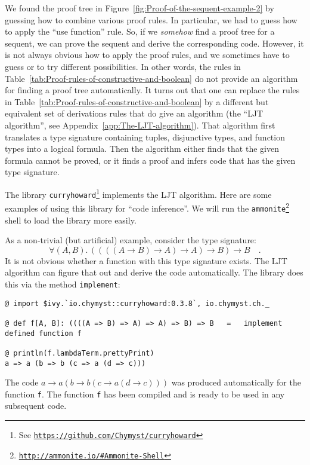 We found the proof tree in Figure~\ref{fig:Proof-of-the-sequent-example-2}
by guessing how to combine various proof rules. In particular, we
had to guess how to apply the \textsf{``}use function\textsf{''} rule. So, if we \emph{somehow}
find a proof tree for a sequent, we can prove the sequent and derive
the corresponding code. However, it is not always obvious how to apply
the proof rules, and we sometimes have to guess or to try different
possibilities. In other words, the rules in Table~\ref{tab:Proof-rules-of-constructive-and-boolean}
do not provide an algorithm for finding a proof tree automatically.
It turns out that one can replace the rules in Table~\ref{tab:Proof-rules-of-constructive-and-boolean}
by a different but equivalent set of derivations rules that do give
an algorithm (the \textsf{``}LJT algorithm\textsf{''}, see Appendix~\ref{app:The-LJT-algorithm}).
That algorithm first translates a type signature containing tuples,
disjunctive types, and function types into a logical formula. Then
the algorithm either finds that the given formula cannot be proved,
or it finds a proof and infers code that has the given type signature.

The library \lstinline!curryhoward!\texttt{}\footnote{See \texttt{\href{https://github.com/Chymyst/curryhoward}{https://github.com/Chymyst/curryhoward}}}
implements the LJT algorithm. Here are some examples of using this
library for \textsf{``}code inference\textsf{''}. We will run
the \lstinline!ammonite!\texttt{}\footnote{\texttt{\href{http://ammonite.io/\#Ammonite-Shell}{http://ammonite.io/\#Ammonite-Shell}}}
shell to load the library more easily.

As a non-trivial (but artificial) example, consider the type signature:
\[
\forall(A,B).\,\left(\left(\left(\left(A\rightarrow B\right)\rightarrow A\right)\rightarrow A\right)\rightarrow B\right)\rightarrow B\quad.
\]
It is not obvious whether a function with this type signature exists.
The LJT algorithm can figure that out and derive the code automatically.
The library does this via the method \lstinline!implement!:
\begin{lstlisting}
@ import $ivy.`io.chymyst::curryhoward:0.3.8`, io.chymyst.ch._

@ def f[A, B]: ((((A => B) => A) => A) => B) => B   =   implement
defined function f

@ println(f.lambdaTerm.prettyPrint)
a => a (b => b (c => a (d => c)))
\end{lstlisting}
The code $a\rightarrow a\left(b\rightarrow b\left(c\rightarrow a\left(d\rightarrow c\right)\right)\right)$
was produced automatically for the function \lstinline!f!. The function
\lstinline!f! has been compiled and is ready to be used in any subsequent
code.

